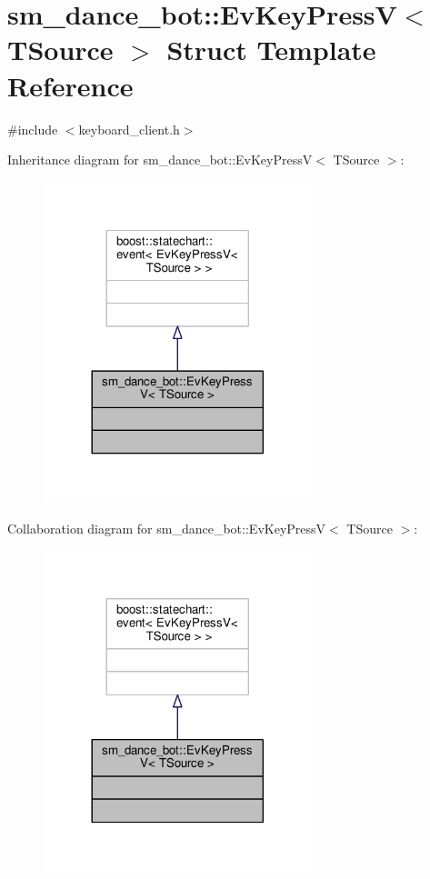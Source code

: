 \hypertarget{structsm__dance__bot_1_1EvKeyPressV}{}\section{sm\+\_\+dance\+\_\+bot\+:\+:Ev\+Key\+PressV$<$ T\+Source $>$ Struct Template Reference}
\label{structsm__dance__bot_1_1EvKeyPressV}


{\ttfamily \#include $<$keyboard\+\_\+client.\+h$>$}



Inheritance diagram for sm\+\_\+dance\+\_\+bot\+:\+:Ev\+Key\+PressV$<$ T\+Source $>$\+:
\nopagebreak
\begin{figure}[H]
\begin{center}
\leavevmode
\includegraphics[width=221pt]{structsm__dance__bot_1_1EvKeyPressV__inherit__graph}
\end{center}
\end{figure}


Collaboration diagram for sm\+\_\+dance\+\_\+bot\+:\+:Ev\+Key\+PressV$<$ T\+Source $>$\+:
\nopagebreak
\begin{figure}[H]
\begin{center}
\leavevmode
\includegraphics[width=221pt]{structsm__dance__bot_1_1EvKeyPressV__coll__graph}
\end{center}
\end{figure}


